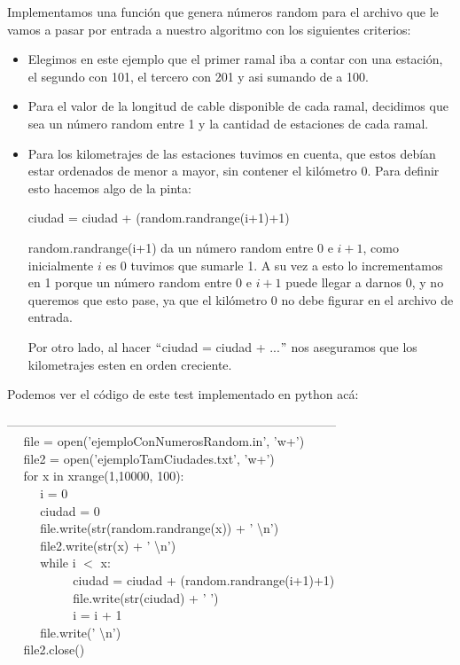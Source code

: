 Implementamos una función que genera números random para el archivo que le vamos a pasar por entrada a nuestro algoritmo con los siguientes criterios:
\begin{itemize}
\item Elegimos en este ejemplo que el primer ramal iba a contar con una estación, el segundo con 101, el tercero con 201 y asi sumando de a 100.
\item Para el valor de la longitud de cable disponible de cada ramal, decidimos que sea un número random entre 1 y la cantidad de estaciones de cada ramal.
\item Para los kilometrajes de las estaciones tuvimos en cuenta, que estos debían estar ordenados de menor a mayor, sin contener el kilómetro 0. Para definir esto hacemos algo de la pinta:

ciudad = ciudad + (random.randrange(i+1)+1)

random.randrange(i+1) da un número random entre 0 e $i+1$, como inicialmente $i$ es 0 tuvimos que sumarle 1. A su vez a esto lo incrementamos en 1 porque un número random entre 0 e $i+1$ puede llegar a darnos 0, y no queremos que esto pase, ya que el kilómetro 0 no debe figurar en el archivo de entrada.

Por otro lado, al hacer $``$ciudad = ciudad + ...$"$ nos aseguramos que los kilometrajes esten en orden creciente.

\end{itemize}

Podemos ver el código de este test implementado en python acá:

--------------------------------------------------------------------------------\\
$~~~~~~$file = open('ejemploConNumerosRandom.in', 'w+')\\
$~~~~~~$file2 = open('ejemploTamCiudades.txt', 'w+')\\
$~~~~~~$for x in xrange(1,10000, 100):\\
$~~~~~~~~~~~~$i = 0\\
$~~~~~~~~~~~~$ciudad = 0\\
$~~~~~~~~~~~~$file.write(str(random.randrange(x)) + ' \textbackslash n')\\
$~~~~~~~~~~~~$file2.write(str(x) + ' \textbackslash n')\\
$~~~~~~~~~~~~$while i $<$ x:\\
$~~~~~~~~~~~~~~~~~~~~~~~~$ciudad = ciudad + (random.randrange(i+1)+1)\\
$~~~~~~~~~~~~~~~~~~~~~~~~$file.write(str(ciudad) + ' ')\\
$~~~~~~~~~~~~~~~~~~~~~~~~$i = i + 1\\
$~~~~~~~~~~~~$file.write(' \textbackslash n')\\
$~~~~~~$file2.close()\\


